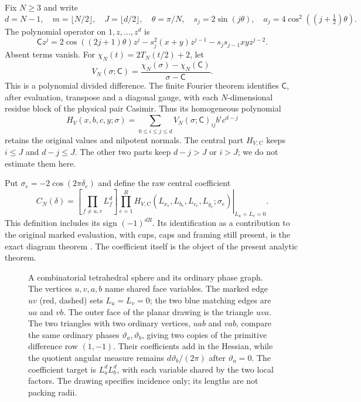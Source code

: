 \documentclass[11pt]{article}
\numberwithin{equation}{section}
\theoremstyle{definition}\newtheorem{definition}[theorem]{Definition}
\theoremstyle{remark}\newtheorem{remark}[theorem]{Remark}
\begin{document}
Fix $N\ge3$ and write
\[
 d=N-1,\quad m=\lfloor N/2\rfloor,\quad J=\lfloor d/2\rfloor,
 \quad\theta=\pi/N,\quad s_j=2\sin(j\theta),
 \quad a_j=4\cos^2((j+\tfrac12)\theta).
\]
The polynomial operator on $1,z,\ldots,z^d$ is
\begin{equation}\label{sa:operator}
 \mathsf C z^j=2\cos((2j+1)\theta)z^j
             -s_j^2(x+y)z^{j-1}-s_js_{j-1}xy z^{j-2}.
\end{equation}
Absent terms vanish. For $\chi_N(t)=2T_N(t/2)+2$, let
\[
 V_N(\sigma;\mathsf C)
       =\frac{\chi_N(\sigma)-\chi_N(\mathsf C)}{\sigma-\mathsf C}.
\]
This is a polynomial divided difference. The finite Fourier theorem
\cite[Proposition 4.1]{Finite} identifies $\mathsf C$, after evaluation,
transpose and a diagonal gauge, with each $N$-dimensional residue block
of the physical pair Casimir. Thus its homogeneous polynomial
\[
 H_V(x,b,c,y;\sigma)=\sum_{0\le i\le j\le d}
                   V_N(\sigma;\mathsf C)_{ij}b^ic^{d-j}
\]
retains the original values and nilpotent normals. The central part
$H_{V,\mathrm C}$ keeps $i\le J$ and $d-j\le J$. The other two
parts keep $d-j>J$ or $i>J$; we do not estimate them here.

Put $\sigma_e=-2\cos(2\pi\delta_e)$ and define the raw central coefficient
\begin{equation}\label{sa:coefficient}
 C_N(\delta)=
 \left[\prod_{f\ne u,v}L_f^d\right]
 \left.\prod_{e=1}^R H_{V,\mathrm C}
       (L_{x_e},L_{b_e},L_{c_e},L_{y_e};\sigma_e)
                  \right|_{L_u=L_v=0}.
\end{equation}
This definition includes its sign $(-1)^{dR}$. Its identification as a
contribution to the original marked evaluation, with cups, caps and
framing still present, is the exact diagram theorem
\cite[Theorem 9.1 and Corollary 9.2]{Finite}. The coefficient itself is
the object of the present analytic theorem.

\begin{figure}[t]
\centering

\caption{A combinatorial tetrahedral sphere and its ordinary phase graph.
The vertices $u,v,a,b$ name shared face variables. The marked edge $uv$
(red, dashed) sets $L_u=L_v=0$; the two blue matching edges are $ua$
and $vb$. The outer face of the planar drawing is the triangle $uva$.
The two triangles with two ordinary vertices, $uab$ and $vab$, compare the same
ordinary phases $\vartheta_a,\vartheta_b$, giving two copies of the
primitive difference row $(1,-1)$. Their coefficients add in the
Hessian, while the quotient angular measure remains
$d\vartheta_b/(2\pi)$ after $\vartheta_a=0$. The coefficient target is
$L_a^dL_b^d$, with each variable shared by the two local factors.
The drawing specifies incidence only; its lengths are not packing radii.}
\label{sa:shared-figure}
\end{figure}
\end{document}
